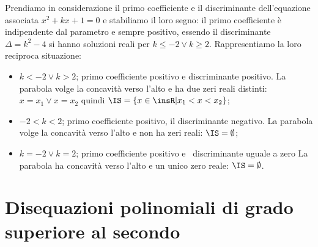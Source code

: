 \begin{exrig}
\begin{esempio}
Prendiamo in considerazione il primo coefficiente e il discriminante dell’equazione associata $x^2+kx+1=0$ e stabiliamo il loro segno: il primo coefficiente è indipendente dal parametro e sempre positivo, essendo il discriminante $\Delta =k^2-4$ si hanno soluzioni reali per $k\le -2\vee k\ge 2$. Rappresentiamo la loro reciproca situazione:
\begin{center}
 
\end{center}
\begin{itemize}
\item $k<-2\vee k>2$; primo coefficiente positivo e discriminante positivo. La parabola volge la concavità verso l’alto e ha due zeri reali distinti: $x=x_1\vee x=x_2$ quindi $\IS=\{x \in \insR | x_1<x<x_2\}$;
\item $-2<k<2$; primo coefficiente positivo, il discriminante negativo. La parabola volge la concavità verso l'alto e non ha zeri reali: $\IS=\emptyset$;
\item $k=-2\vee k=2$; primo coefficiente positivo e \ discriminante uguale a zero La parabola ha concavità verso l'alto e un unico zero reale: $\IS=\emptyset$.
\end{itemize}
\end{esempio}
\end{exrig}

\vspazio\ovalbox{\risolvii \ref{ese:4.27}, \ref{ese:4.28}, \ref{ese:4.29}, \ref{ese:4.30}, \ref{ese:4.31}}

\section{Disequazioni polinomiali di grado superiore al secondo}

